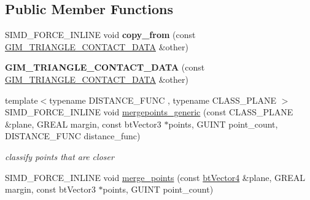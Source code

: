 \subsection*{Public Member Functions}
\begin{DoxyCompactItemize}
\item 
\mbox{\label{structGIM__TRIANGLE__CONTACT__DATA_a1ee8cd81406ddf9e64f725f97d172db0}} 
S\+I\+M\+D\+\_\+\+F\+O\+R\+C\+E\+\_\+\+I\+N\+L\+I\+NE void {\bfseries copy\+\_\+from} (const \hyperlink{structGIM__TRIANGLE__CONTACT__DATA}{G\+I\+M\+\_\+\+T\+R\+I\+A\+N\+G\+L\+E\+\_\+\+C\+O\+N\+T\+A\+C\+T\+\_\+\+D\+A\+TA} \&other)
\item 
\mbox{\label{structGIM__TRIANGLE__CONTACT__DATA_a99ff857d8f9f1e8cdd34875a50fe3caf}} 
{\bfseries G\+I\+M\+\_\+\+T\+R\+I\+A\+N\+G\+L\+E\+\_\+\+C\+O\+N\+T\+A\+C\+T\+\_\+\+D\+A\+TA} (const \hyperlink{structGIM__TRIANGLE__CONTACT__DATA}{G\+I\+M\+\_\+\+T\+R\+I\+A\+N\+G\+L\+E\+\_\+\+C\+O\+N\+T\+A\+C\+T\+\_\+\+D\+A\+TA} \&other)
\item 
\mbox{\label{structGIM__TRIANGLE__CONTACT__DATA_a159d51dfe240909dda5436304a655500}} 
{\footnotesize template$<$typename D\+I\+S\+T\+A\+N\+C\+E\+\_\+\+F\+U\+NC , typename C\+L\+A\+S\+S\+\_\+\+P\+L\+A\+NE $>$ }\\S\+I\+M\+D\+\_\+\+F\+O\+R\+C\+E\+\_\+\+I\+N\+L\+I\+NE void \hyperlink{structGIM__TRIANGLE__CONTACT__DATA_a159d51dfe240909dda5436304a655500}{mergepoints\+\_\+generic} (const C\+L\+A\+S\+S\+\_\+\+P\+L\+A\+NE \&plane, G\+R\+E\+AL margin, const bt\+Vector3 $\ast$points, G\+U\+I\+NT point\+\_\+count, D\+I\+S\+T\+A\+N\+C\+E\+\_\+\+F\+U\+NC distance\+\_\+func)
\begin{DoxyCompactList}\small\item\em classify points that are closer \end{DoxyCompactList}\item 
\mbox{\label{structGIM__TRIANGLE__CONTACT__DATA_a4d3e25d735f8e5111bb54dd764cbb041}} 
S\+I\+M\+D\+\_\+\+F\+O\+R\+C\+E\+\_\+\+I\+N\+L\+I\+NE void \hyperlink{structGIM__TRIANGLE__CONTACT__DATA_a4d3e25d735f8e5111bb54dd764cbb041}{merge\+\_\+points} (const \hyperlink{classbtVector4}{bt\+Vector4} \&plane, G\+R\+E\+AL margin, const bt\+Vector3 $\ast$points, G\+U\+I\+NT point\+\_\+count)

\end{DoxyCompactItemize}
